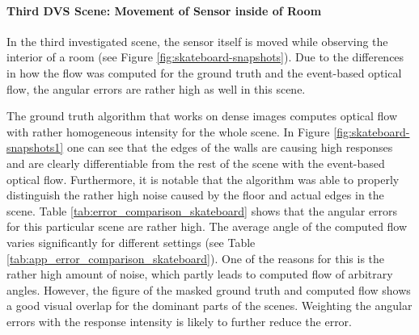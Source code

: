 \paragraph{Third DVS Scene: Movement of Sensor inside of Room}

In the third investigated scene, the sensor itself is moved while observing the interior of a room (see Figure \ref{fig:skateboard-snapshots}). 
Due to the differences in how the flow was computed for the ground truth and the event-based optical flow, the angular errors are rather high as well in this scene.

The ground truth algorithm that works on dense images computes optical flow with rather homogeneous intensity for the whole scene.
In Figure \ref{fig:skateboard-snapshots1} one can see that the edges of the walls are causing high responses and are clearly differentiable from the rest of the scene with the event-based optical flow.
Furthermore, it is notable that the algorithm was able to properly distinguish the rather high noise caused by the floor and actual edges in the scene.
Table \ref{tab:error_comparison_skateboard} shows that the angular errors for this particular scene are rather high.
The average angle of the computed flow varies significantly for different settings (see Table \ref{tab:app_error_comparison_skateboard}). 
One of the reasons for this is the rather high amount of noise, which partly leads to computed flow of arbitrary angles.
However, the figure of the masked ground truth and computed flow shows a good visual overlap for the dominant parts of the scenes.
Weighting the angular errors with the response intensity is likely to further reduce the error.


